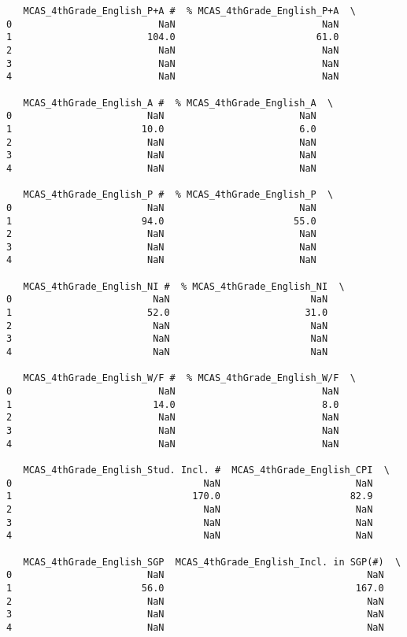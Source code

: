 \documentclass[11pt]{article}
\begin{document}
\begin{verbatim}
   MCAS_4thGrade_English_P+A #  % MCAS_4thGrade_English_P+A  \
0                          NaN                          NaN   
1                        104.0                         61.0   
2                          NaN                          NaN   
3                          NaN                          NaN   
4                          NaN                          NaN   

   MCAS_4thGrade_English_A #  % MCAS_4thGrade_English_A  \
0                        NaN                        NaN   
1                       10.0                        6.0   
2                        NaN                        NaN   
3                        NaN                        NaN   
4                        NaN                        NaN   

   MCAS_4thGrade_English_P #  % MCAS_4thGrade_English_P  \
0                        NaN                        NaN   
1                       94.0                       55.0   
2                        NaN                        NaN   
3                        NaN                        NaN   
4                        NaN                        NaN   

   MCAS_4thGrade_English_NI #  % MCAS_4thGrade_English_NI  \
0                         NaN                         NaN   
1                        52.0                        31.0   
2                         NaN                         NaN   
3                         NaN                         NaN   
4                         NaN                         NaN   

   MCAS_4thGrade_English_W/F #  % MCAS_4thGrade_English_W/F  \
0                          NaN                          NaN   
1                         14.0                          8.0   
2                          NaN                          NaN   
3                          NaN                          NaN   
4                          NaN                          NaN   

   MCAS_4thGrade_English_Stud. Incl. #  MCAS_4thGrade_English_CPI  \
0                                  NaN                        NaN   
1                                170.0                       82.9   
2                                  NaN                        NaN   
3                                  NaN                        NaN   
4                                  NaN                        NaN   

   MCAS_4thGrade_English_SGP  MCAS_4thGrade_English_Incl. in SGP(#)  \
0                        NaN                                    NaN   
1                       56.0                                  167.0   
2                        NaN                                    NaN   
3                        NaN                                    NaN   
4                        NaN                                    NaN   


\end{verbatim}
\end{document}
